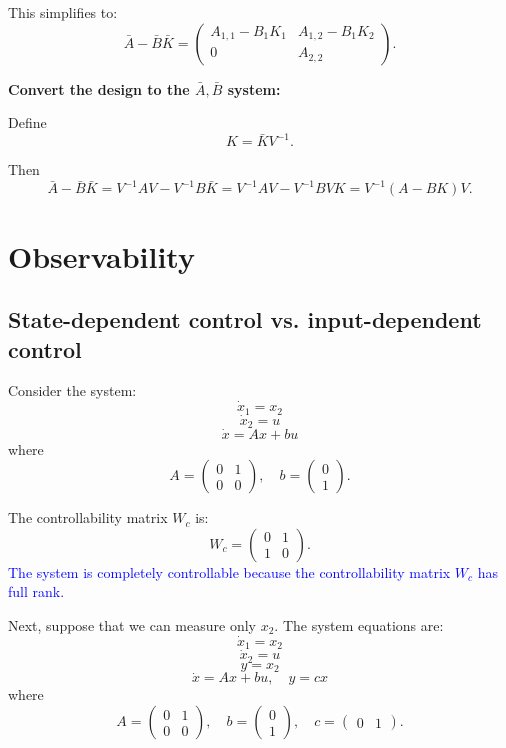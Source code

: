\documentclass{article}
\begin{document}
This simplifies to:
\[
\bar{A} - \bar{B}\bar{K} = \begin{pmatrix}
A_{1,1} - B_1K_1 & A_{1,2} - B_1K_2 \\
0 & A_{2,2}
\end{pmatrix}.
\]

\textbf{Convert the design to the $\bar{A}, \bar{B}$ system:}

Define
\[
K = \bar{K}V^{-1}.
\]

Then
\[
\bar{A} - \bar{B}\bar{K} = V^{-1}AV - V^{-1}B\bar{K}
= V^{-1}AV - V^{-1}BVK = V^{-1}(A - BK)V.
\]

\section{Observability}

\subsection{State-dependent control vs. input-dependent control}

Consider the system:
\[
\dot{x}_1 = x_2
\]
\[
\dot{x}_2 = u
\]
\[
\dot{x} = Ax + bu
\]
where
\[
A = \begin{pmatrix}
0 & 1 \\
0 & 0
\end{pmatrix}, \quad b = \begin{pmatrix}
0 \\
1
\end{pmatrix}.
\]

The controllability matrix $W_c$ is:
\[
W_c = \begin{pmatrix}
0 & 1 \\
1 & 0
\end{pmatrix}.
\]
\textcolor{blue}{The system is completely controllable because the controllability matrix $W_c$ has full rank.}

Next, suppose that we can measure only $x_2$. The system equations are:
\[
\dot{x}_1 = x_2
\]
\[
\dot{x}_2 = u
\]
\[
y = x_2
\]
\[
\dot{x} = Ax + bu, \quad y = cx
\]
where
\[
A = \begin{pmatrix}
0 & 1 \\
0 & 0
\end{pmatrix}, \quad b = \begin{pmatrix}
0 \\
1
\end{pmatrix}, \quad c = \begin{pmatrix}
0 & 1
\end{pmatrix}.
\]
\end{document}
